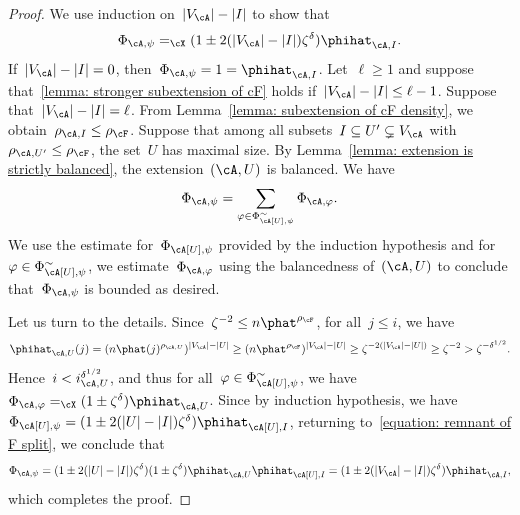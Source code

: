 \documentclass[11pt]{amsart}
\DeclarePairedDelimiter{\abs}{\lvert}{\rvert}
\newcommand{\Xeq}{=_{\cX}}
\def\phi{\varphi}
\theoremstyle{definition}
\numberwithin{equation}{section}
\begin{document}
	\begin{proof}
		We use induction on~$\abs{V_\cA}-\abs{I}$ to show that
		\begin{equation}\label{lemma: stronger subextension of cF}
			\Phi_{\cA,\psi}\Xeq(1\pm 2(\abs{V_\cA}-\abs{ I})\zeta^\delta)\phihat_{\cA,I}.
		\end{equation}
		If~$\abs{V_\cA}-\abs{I}=0$, then~$\Phi_{\cA,\psi}=1=\phihat_{\cA,I}$.
		Let~$\ell\geq 1$ and suppose that~\eqref{lemma: stronger subextension of cF} holds if~$\abs{V_\cA}-\abs{I}\leq \ell-1$.
		Suppose that~$\abs{V_\cA}-\abs{I}=\ell$.
		From Lemma~\ref{lemma: subextension of cF density}, we obtain~$\rho_{\cA,I}\leq\rho_\cF$.
		Suppose that among all subsets~$I\subseteq U'\subsetneq V_\cA$ with~$\rho_{\cA,U'}\leq \rho_\cF$, the set~$U$ has maximal size.
		By Lemma~\ref{lemma: extension is strictly balanced}, the extension~$(\cA,U)$ is balanced.
		We have
		\begin{equation}\label{equation: remnant of F split}
			\Phi_{\cA,\psi}=\sum_{\phi\in\Phi_{\cA[U],\psi}^{\sim}}\Phi_{\cA,\phi}.
		\end{equation}
		We use the estimate for~$\Phi_{\cA[U],\psi}$  provided by the induction hypothesis and for~$\phi\in\Phi_{\cA[U],\psi}^{\sim}$, we estimate~$\Phi_{\cA,\phi}$ using the balancedness of~$(\cA,U)$ to conclude that~$\Phi_{\cA,\psi}$ is bounded as desired.
		
		Let us turn to the details.
		Since~$\zeta^{-2}\leq n\phat^{\rho_\cF}$, for all~$j\leq i$, we have
		\begin{equation*}
			\phihat_{\cA,U}(j)
			=(n\phat(j)^{\rho_{\cA,U}})^{\abs{V_\cA}-\abs{U}}
			\geq (n\phat^{\rho_{\cF}})^{\abs{V_\cA}-\abs{U}}
			\geq \zeta^{-2(\abs{V_\cA}-\abs{U})}
			\geq \zeta^{-2}
			> \zeta^{-\delta^{1/2}}.
		\end{equation*}
		Hence~$i< i_{\cA,U}^{\delta^{1/2}}$, and thus for all~$\phi\in\Phi^\sim_{\cA[U],\psi}$, we have~$\Phi_{\cA,\phi}\Xeq (1\pm\zeta^\delta)\phihat_{\cA,U}$.
		Since by induction hypothesis, we have~$\Phi_{\cA[U],\psi}=(1\pm 2(\abs{U}-\abs{I})\zeta^\delta)\phihat_{\cA[U],I}$, returning to~\eqref{equation: remnant of F split}, we conclude that
		\begin{align*}
			\Phi_{\cA,\psi}
			=(1\pm 2(\abs{U}-\abs{I})\zeta^\delta)(1\pm \zeta^\delta)\phihat_{\cA,U}\phihat_{\cA[U],I}
			=(1\pm 2(\abs{V_\cA}-\abs{I})\zeta^\delta)\phihat_{\cA,I},
		\end{align*}
		which completes the proof.
	\end{proof}
	
\end{document}
